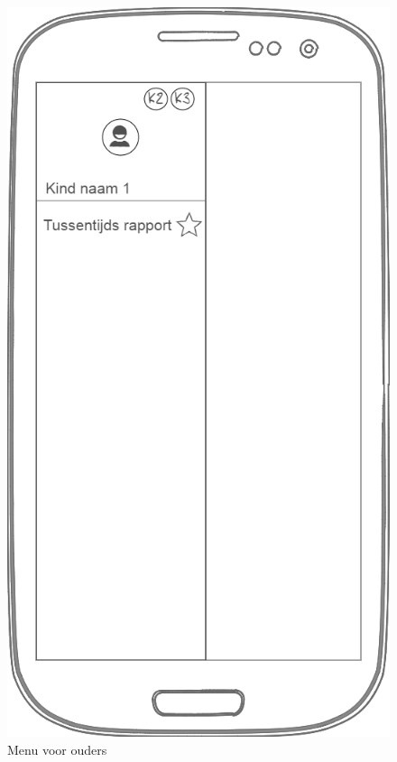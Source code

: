 \documentclass[a4paper]{article}
\begin{document}
\begin{appendices}
\newpage
\begin{figure}[H]
  \centerline{\includegraphics[width=\textwidth*4/5]{MobieleApp/ouders_view}}
  \caption{Menu voor ouders}
  \label{fig:mobiel_ouder}
\end{figure}


\end{appendices}
\end{document}
